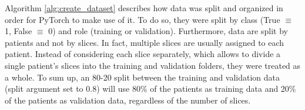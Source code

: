 Algorithm \ref{alg:create_dataset} describes how data was split and organized in order for PyTorch to make use of it. To do so, they were split by class (True $\equiv$ 1, False $\equiv$ 0) and role (training or validation). Furthermore, data are split by patients and not by slices. In fact, multiple slices are usually assigned to each patient. Instead of considering each slice separately, which allows to divide a single patient's slices into the training and validation folders, they were treated as a whole. To sum up, an 80-20 split between the training and validation data (split argument set to $0.8$) will use 80\% of the patients as training data and 20\% of the patients as validation data, regardless of the number of slices.